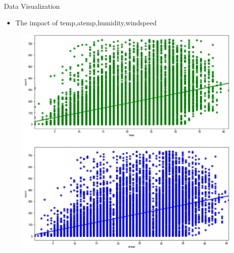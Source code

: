 \documentclass[
 size=14pt,
 paper=smartboard,  %
 mode=present, 		%
 display=slides, 	%
 style=tuliplab,  	%
 pauseslide,
 fleqn,leqno]{powerdot}
\begin{document}
\begin{slide}[toc=,bm=]{Data  Visualization}
  \begin{center}

    {
      \begin{itemize}
        
          \item The impact of temp,atemp,humidity,windspeed
      \end{itemize} 
      \begin{figure}
        \centering
        \begin{minipage}[t]{0.45\textwidth}
        \centering
        \includegraphics[width=1\textwidth]{pic/three tahw1.eps}
        \end{minipage}
        \begin{minipage}[t]{0.45\textwidth}
        \centering

\end{minipage}
\end{figure}}
\end{center}
\end{slide}
\end{document}
